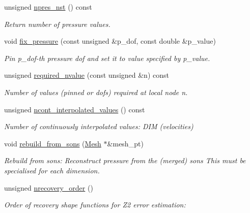\begin{DoxyCompactItemize}
unsigned \hyperlink{classoomph_1_1PRefineableGeneralisedNewtonianQCrouzeixRaviartElement_a68ed322582ba179cd0845bbd498e11b9}{npres\+\_\+nst} () const
\begin{DoxyCompactList}\small\item\em Return number of pressure values. \end{DoxyCompactList}\item 
void \hyperlink{classoomph_1_1PRefineableGeneralisedNewtonianQCrouzeixRaviartElement_aad3e0f421f695de35837393b7520d05a}{fix\+\_\+pressure} (const unsigned \&p\+\_\+dof, const double \&p\+\_\+value)
\begin{DoxyCompactList}\small\item\em Pin p\+\_\+dof-\/th pressure dof and set it to value specified by p\+\_\+value. \end{DoxyCompactList}\item 
unsigned \hyperlink{classoomph_1_1PRefineableGeneralisedNewtonianQCrouzeixRaviartElement_a84706eee87eeaf48a3fe4b30c413aacd}{required\+\_\+nvalue} (const unsigned \&n) const
\begin{DoxyCompactList}\small\item\em Number of values (pinned or dofs) required at local node n. \end{DoxyCompactList}\item 
unsigned \hyperlink{classoomph_1_1PRefineableGeneralisedNewtonianQCrouzeixRaviartElement_ad06beb84a9e912db67814f0eb8add2fb}{ncont\+\_\+interpolated\+\_\+values} () const
\begin{DoxyCompactList}\small\item\em Number of continuously interpolated values\+: D\+IM (velocities) \end{DoxyCompactList}\item 
void \hyperlink{classoomph_1_1PRefineableGeneralisedNewtonianQCrouzeixRaviartElement_a3798bef44fa4927be5c844432fc212d9}{rebuild\+\_\+from\+\_\+sons} (\hyperlink{classoomph_1_1Mesh}{Mesh} $\ast$\&mesh\+\_\+pt)
\begin{DoxyCompactList}\small\item\em Rebuild from sons\+: Reconstruct pressure from the (merged) sons This must be specialised for each dimension. \end{DoxyCompactList}\item 
unsigned \hyperlink{classoomph_1_1PRefineableGeneralisedNewtonianQCrouzeixRaviartElement_a0031a3c03dd28974a552fdc9de0ff6c5}{nrecovery\+\_\+order} ()
\begin{DoxyCompactList}\small\item\em Order of recovery shape functions for Z2 error estimation\+: \end{DoxyCompactList}\item 

\end{DoxyCompactItemize}
